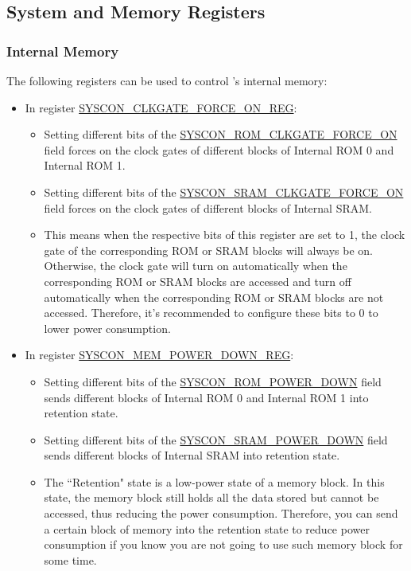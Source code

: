 \documentclass[main\_\_EN.tex]{subfiles}
\begin{document}
\subsection{System and Memory Registers}
\subsubsection{Internal Memory}

The following registers can be used to control \chipname{}'s internal memory:

\begin{itemize}
    \item In register \hyperref[regdesc:SYSCONCLKGATEFORCEONREG]{SYSCON\_CLKGATE\_FORCE\_ON\_REG}:
    \begin{itemize}
        \item Setting different bits of the \hyperref[fielddesc:SYSCONROMCLKGATEFORCEON]{SYSCON\_ROM\_CLKGATE\_FORCE\_ON} field forces on the clock gates of different blocks of Internal ROM 0 and Internal ROM 1.
        \item Setting different bits of the \hyperref[fielddesc:SYSCONSRAMCLKGATEFORCEON]{SYSCON\_SRAM\_CLKGATE\_FORCE\_ON} field forces on the clock gates of different blocks of Internal SRAM.
        \item This means when the respective bits of this register are set to 1, the clock gate of the corresponding ROM or SRAM blocks will always be on. Otherwise, the clock gate will turn on automatically when the corresponding ROM or SRAM blocks are accessed and turn off automatically when the corresponding ROM or SRAM blocks are not accessed. Therefore, it's recommended to configure these bits to 0 to lower power consumption.
    \end{itemize}
    \item In register \hyperref[regdesc:SYSCONMEMPOWERDOWNREG]{SYSCON\_MEM\_POWER\_DOWN\_REG}:
    \begin{itemize}
        \item Setting different bits of the \hyperref[fielddesc:SYSCONROMPOWERDOWN]{SYSCON\_ROM\_POWER\_DOWN} field sends different blocks of Internal ROM 0 and Internal ROM 1 into retention state.
        \item Setting different bits of the \hyperref[fielddesc:SYSCONSRAMPOWERDOWN]{SYSCON\_SRAM\_POWER\_DOWN} field sends different blocks of Internal SRAM into retention state.
        \item The ``Retention" state is a low-power state of a memory block. In this state, the memory block still holds all the data stored but cannot be accessed, thus reducing the power consumption. Therefore, you can send a certain block of memory into the retention state to reduce power consumption if you know you are not going to use such memory block for some time.

\end{itemize}
\end{itemize}
\end{document}
